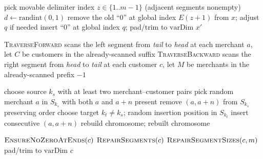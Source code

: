 \documentclass[a4paper]{article}
\newcommand{\varDim}{\text{varDim}}
\begin{document}
\begin{algorithm}[htbp]
\caption{Mutation Type3: slide one delimiter ``0'' (pair-safe boundaries)}
\KwData{$x$, segments $\{S_k\}$, $E$, counts $m,n,\varDim$}
pick movable delimiter index $z \in \{1..m{-}1\}$ (adjacent segments nonempty)\;
$d \gets \mathrm{randint}(0,1)$ 
remove the old ``0'' at global index $E(z{+}1)$ from $x$; adjust $q$ if needed\;
insert ``0'' at global index $q$; pad/trim to $\varDim$\;
\Return $x'$\;
\end{algorithm}

\begin{algorithm}[htbp]
\caption{TraverseForward / TraverseBackward (Type3 helpers, sketch)}
\textsc{TraverseForward} scans the left segment from \emph{tail} to \emph{head}\;
\Indp
at each merchant $a$, let $C$ be customers in the already-scanned suffix\;
\Indm
\textsc{TraverseBackward} scans the right segment from \emph{head} to \emph{tail}\;
\Indp
at each customer $c$, let $M$ be merchants in the already-scanned prefix\;
\Indm
\Return $-1$\;
\end{algorithm}

\begin{algorithm}[htbp]
\caption{Type4\_SegSwap (sketch)}
choose source $k_s$ with at least two merchant--customer pairs\;
pick random merchant $a$ in $S_{k_s}$ with both $a$ and $a{+}n$ present\;
remove $(a,a{+}n)$ from $S_{k_s}$ preserving order\;
choose target $k_t \neq k_s$; random insertion position in $S_{k_t}$\;
insert consecutive $(a,a{+}n)$\;
rebuild chromosome; 
\Return rebuilt chromosome\;
\end{algorithm}

\begin{algorithm}[htbp]
\caption{Repair pipeline (abstract)}
$\textsc{EnsureNoZeroAtEnds}(c)$\;
$\textsc{RepairSegments}(c)$ 
$\textsc{RepairSegmentSizes}(c,m)$ 
pad/trim to $\varDim$\;
\Return $c$\;
\end{algorithm}
\end{document}
